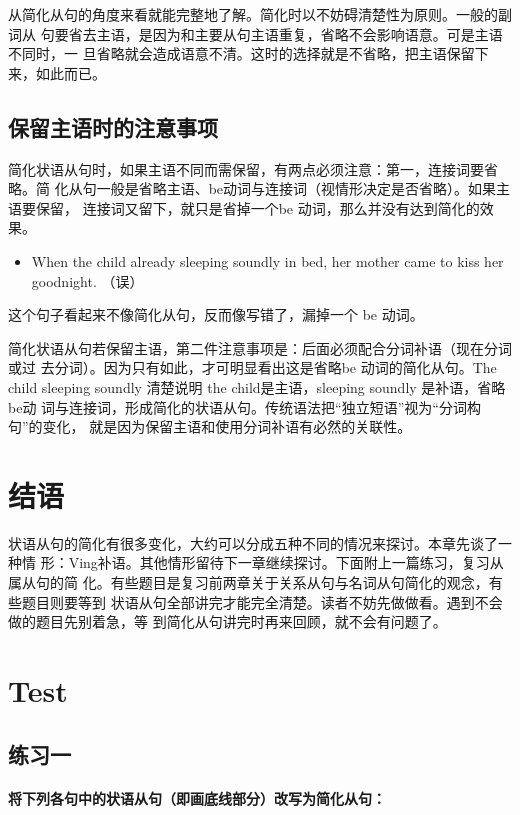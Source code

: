 从简化从句的角度来看就能完整地了解。简化时以不妨碍清楚性为原则。一般的副词从
句要省去主语，是因为和主要从句主语重复，省略不会影响语意。可是主语不同时，一
旦省略就会造成语意不清。这时的选择就是不省略，把主语保留下来，如此而已。

\subsection{保留主语时的注意事项}

简化状语从句时，如果主语不同而需保留，有两点必须注意：第一，连接词要省略。简
化从句一般是省略主语、be动词与连接词（视情形决定是否省略）。如果主语要保留，
连接词又留下，就只是省掉一个be 动词，那么并没有达到简化的效果。

\begin{itemize}
\item   When the child already sleeping soundly in bed, her mother came to
  kiss her goodnight. （误）
\end{itemize}
这个句子看起来不像简化从句，反而像写错了，漏掉一个 be 动词。

简化状语从句若保留主语，第二件注意事项是：后面必须配合分词补语（现在分词或过
去分词）。因为只有如此，才可明显看出这是省略be 动词的简化从句。The child
sleeping soundly 清楚说明 the child是主语，sleeping soundly 是补语，省略 be动
词与连接词，形成简化的状语从句。传统语法把“独立短语”视为“分词构句”的变化，
就是因为保留主语和使用分词补语有必然的关联性。

\section{结语}

状语从句的简化有很多变化，大约可以分成五种不同的情况来探讨。本章先谈了一种情
形：Ving补语。其他情形留待下一章继续探讨。下面附上一篇练习，复习从属从句的简
化。有些题目是复习前两章关于关系从句与名词从句简化的观念，有些题目则要等到
状语从句全部讲完才能完全清楚。读者不妨先做做看。遇到不会做的题目先别着急，等
到简化从句讲完时再来回顾，就不会有问题了。

\section{Test}

\subsection{练习一}

\paragraph{将下列各句中的状语从句（即画底线部分）改写为简化从句：}

